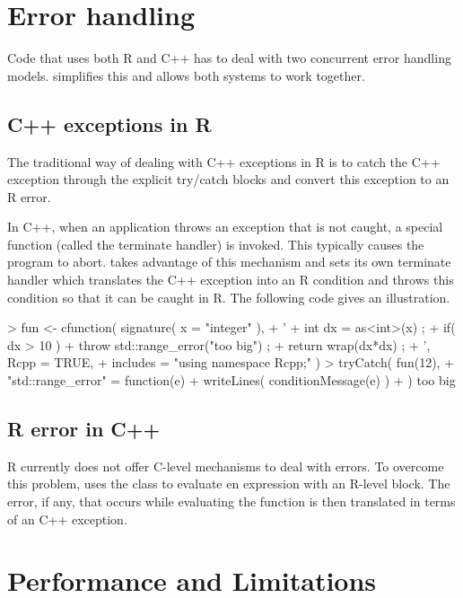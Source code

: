 \section{Error handling}

Code that uses both R and C++ has to deal with two concurrent
error handling models.  simplifies this and allows both 
systems to work together.

\subsection{C++ exceptions in R}

The traditional way of dealing with C++ exceptions in R is to
catch the C++ exception through the explicit try/catch blocks and
convert this exception to an R error. 

In C++, when an application throws an exception that is not caught, 
a special function (called the terminate handler) is invoked. This typically causes 
the program to abort.  takes advantage of this mechanism
and sets its own terminate handler which translates the C++
exception into an R condition and throws this condition so that it can 
be caught in R. The following code gives an illustration. 

\begin{example}
> fun <- cfunction( signature( x = "integer" ), 
+ ' 
+   int dx = as<int>(x) ;
+   if( dx > 10 ) 
+      throw std::range_error("too big") ;
+   return wrap(dx*dx) ;
+ ', Rcpp = TRUE, 
+  includes = "using namespace Rcpp;" )
> tryCatch( fun(12), 
+ "std::range_error" = function(e){
+    writeLines( conditionMessage(e) )
+ } )
too big
\end{example}

\subsection{R error in C++}

R currently does not offer C-level mechanisms to deal with errors. To 
overcome this problem,  uses the 
class to evaluate en expression with an R-level 
block. The error, if any, that occurs while evaluating the 
function is then translated in terms of an C++ exception. 


\section{Performance and Limitations}

